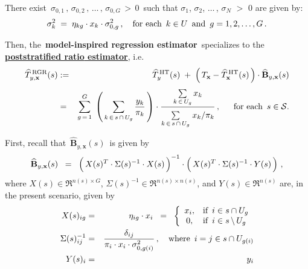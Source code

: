 \begin{proposition}
\begin{enumerate}
	There exist \,$\sigma_{0,1} \,,\, \sigma_{0,2} \,,\, \ldots \,,\, \sigma_{0,G} \,>\, 0$\,
	such that
	$\sigma_{1}$, $\sigma_{2}$, $\ldots$\,, $\sigma_{N}$ $>$ $0$ are given by:
	\begin{equation*}
	\sigma_{k}^{2} \; = \; \eta_{kg} \cdot x_{k} \cdot \sigma_{0,g}^{2}\,,
	\quad\textnormal{for each \,$k \in U$\, and \,$g = 1,2,\ldots,G$}\,.
	\end{equation*}
\end{enumerate}
\renewcommand{\theenumi}{\roman{enumi}}
\renewcommand{\labelenumi}{\textnormal{(\theenumi)}$\;\;$}
Then, the \,\textbf{model-inspired regression estimator}\,
specializes to the \,\underline{\textbf{{\color{red}poststratified ratio} estimator}}, i.e.
\begin{eqnarray*}
\widehat{T}^{\,\textnormal{RGR}}_{y,\mathbf{x}}(s)
& := &
	\widehat{T}^{\,\textnormal{HT}}_{y}(s)
	\; + \;
	\left(\,T_{\mathbf{x}} - \widehat{T}^{\,\textnormal{HT}}_{\mathbf{x}}(s) \,\right)
	\cdot
	\widehat{\mathbf{B}}_{y,\mathbf{x}}(s)
\\
& = &
	\overset{G}{\underset{g\,=\,1}{\sum}}\;
	\left(\,
		\underset{k\,\in\,s\,\cap\,U_{g}}{\sum}\, \dfrac{y_{k}}{\pi_{k}}
	\,\right)
	\cdot
	\dfrac{
		\underset{k\,\in\,U_{g}}{\overset{{\color{white}.}}{\sum}}\, x_{k}
		}{
		\underset{k\,\in\,s\,\cap\,U_{g}}{\overset{{\color{white}.}}{\sum}}\;x_{k}/\pi_{k}
		}
	\,,\;\;\quad\textnormal{for each \,$s \in \mathcal{S}$}.
\end{eqnarray*}
\end{proposition}
\proof
First, recall that \,$\widehat{\mathbf{B}}_{y,\mathbf{x}}(s)$\, is given by
\begin{equation*}
\widehat{\mathbf{B}}_{y,\mathbf{x}}(s)
\;\; = \;\;
	\left(\,X(s)^{T} \overset{{\color{white}!}}{\cdot} \Sigma(s)^{-1} \cdot X(s)\,\right)^{-1}
	\cdot
	\left(\,X(s)^{T} \overset{{\color{white}!}}{\cdot} \Sigma(s)^{-1} \cdot Y(s) \,\right)\,,
\end{equation*}
where $X(s) \in \Re^{n(s) \times G}$, $\Sigma(s)^{-1} \in \Re^{n(s) \times n(s)}$, and $Y(s) \in \Re^{n(s)}$
are, in the present scenario, given by
\begin{eqnarray*}
X(s)_{ig}
& = &
	\eta_{ig} \cdot x_{i}
\;\; = \;\;
	\left\{\begin{array}{cl}
		x_{i}, &  \textnormal{if \,$i \in s \cap U_{g}$}
		\\
		0, & \textnormal{if \,$i \in s\,\backslash\,U_{g}$}
	\end{array}\right.
\\
\Sigma(s)^{-1}_{ij}
& = &
	\dfrac{\delta_{ij}}{\pi_{i}\cdot x_{i} \cdot\sigma^{2}_{0,g(i)}}\,,
	\quad
	\textnormal{where \,$i = j \in s \cap U_{g(i)}$}
\\
Y(s)_{i}
& = &
	y_{i}
\end{eqnarray*}
